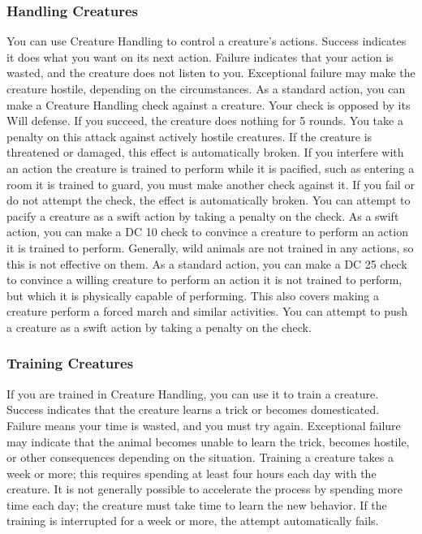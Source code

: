 \subsubsection{Handling Creatures}
You can use Creature Handling to control a creature's actions. Success indicates it does what you want on its next action. Failure indicates that your action is wasted, and the creature does not listen to you. Exceptional failure may make the creature hostile, depending on the circumstances.
 As a standard action, you can make a Creature Handling check against a creature. Your check is opposed by its Will defense. If you succeed, the creature does nothing for 5 rounds. You take a  penalty on this attack against actively hostile creatures. If the creature is threatened or damaged, this effect is automatically broken. If you interfere with an action the creature is trained to perform while it is pacified, such as entering a room it is trained to guard, you must make another check against it. If you fail or do not attempt the check, the effect is automatically broken. You can attempt to pacify a creature as a swift action by taking a  penalty on the check.
 As a swift action, you can make a DC 10 check to convince a creature to perform an action it is trained to perform. Generally, wild animals are not trained in any actions, so this is not effective on them.
 As a standard action, you can make a DC 25 check to convince a willing creature to perform an action it is not trained to perform, but which it is physically capable of performing. This also covers making a creature perform a forced march and similar activities. You can attempt to push a creature as a swift action by taking a  penalty on the check.

\subsubsection{Training Creatures}
If you are trained in Creature Handling, you can use it to train a creature. Success indicates that the creature learns a trick or becomes domesticated. Failure means your time is wasted, and you must try again. Exceptional failure may indicate that the animal becomes unable to learn the trick, becomes hostile, or other consequences depending on the situation. Training a creature takes a week or more; this requires spending at least four hours each day with the creature. It is not generally possible to accelerate the process by spending more time each day; the creature must take time to learn the new behavior. If the training is interrupted for a week or more, the attempt automatically fails.

